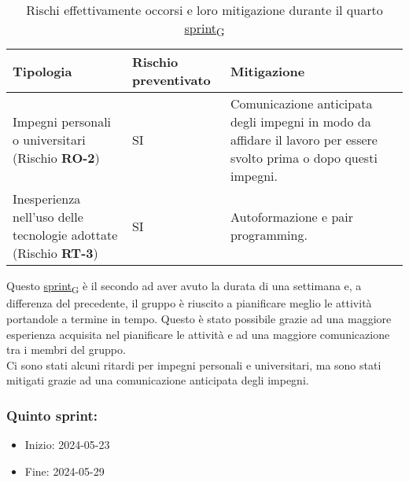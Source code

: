 \begin{table}[!h]
	\centering
	\begin{tabular}{ | p{6cm} | p{2.5cm} | p{7.5cm} | }
		\hline
		\textbf{Tipologia}                                                      & \textbf{Rischio preventivato} & \textbf{Mitigazione}                                                                                                \\
		\hline
		Impegni personali o universitari (Rischio \textbf{RO-2})                & SI                            & Comunicazione anticipata degli impegni in modo da affidare il lavoro per essere svolto prima o dopo questi impegni. \\
		\hline
		Inesperienza nell'uso delle tecnologie adottate (Rischio \textbf{RT-3}) & SI                            & Autoformazione e pair programming.                                                                                  \\
		\hline
	\end{tabular}
	\caption{Rischi effettivamente occorsi e loro mitigazione durante il quarto \href{https://7last.github.io/docs/rtb/documentazione-interna/glossario\#sprint}{sprint\textsubscript{G}}}
	
\end{table}
\newpage
{}
Questo \href{https://7last.github.io/docs/rtb/documentazione-interna/glossario\#sprint}{sprint\textsubscript{G}} è il secondo ad aver avuto la durata di una settimana e, a differenza del precedente, il gruppo è riuscito
a pianificare meglio le attività portandole a termine in tempo.
Questo è stato possibile grazie ad una maggiore esperienza acquisita nel pianificare le attività e ad una maggiore
comunicazione tra i membri del gruppo.\\
Ci sono stati alcuni ritardi per impegni personali e universitari, ma sono stati mitigati grazie ad una comunicazione
anticipata degli impegni.

\subsubsection{Quinto sprint:} 
\begin{itemize}
    \item Inizio: 2024-05-23
    \item Fine: 2024-05-29 
\end{itemize}

